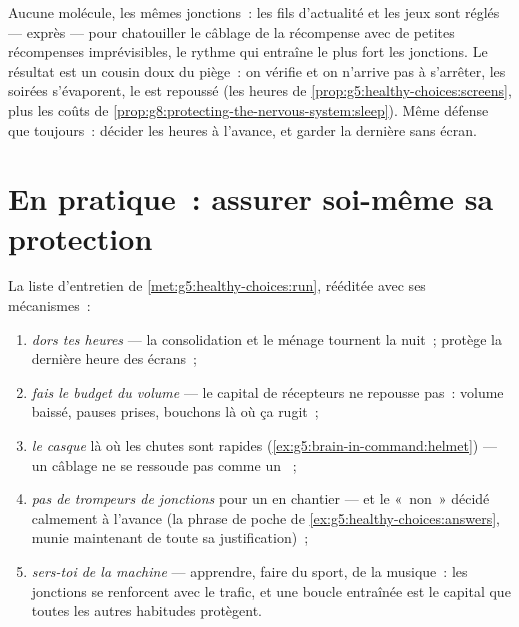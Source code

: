 \begin{example}\label{ex:g8:protecting-the-nervous-system:screens}
Aucune molécule, les mêmes jonctions~: les fils d'actualité
et les jeux sont réglés --- exprès --- pour chatouiller le
câblage de la récompense avec de petites récompenses
imprévisibles, le rythme qui entraîne le plus fort les
jonctions. Le résultat est un cousin doux du piège~: on
vérifie et on n'arrive pas à s'arrêter, les soirées
s'évaporent, le  est repoussé (les heures de
\cref{prop:g5:healthy-choices:screens}, plus les coûts de
\cref{prop:g8:protecting-the-nervous-system:sleep}). Même
défense que toujours~: décider les heures à l'avance, et
garder la dernière sans écran.
\end{example}

\section{En pratique~: assurer soi-même sa protection}

\begin{method}\label{met:g8:protecting-the-nervous-system:manual}
La liste d'entretien de \cref{met:g5:healthy-choices:run},
rééditée avec ses mécanismes~:
\begin{enumerate}
  \item \emph{dors tes heures} --- la consolidation et le
        ménage tournent la nuit~; protège la dernière
        heure des écrans~;
  \item \emph{fais le budget du volume} --- le capital de
        récepteurs ne repousse pas~: volume baissé, pauses
        prises, bouchons là où ça rugit~;
  \item \emph{le casque} là où les chutes sont rapides
        (\cref{ex:g5:brain-in-command:helmet}) --- un
        câblage ne se ressoude pas comme un ~;
  \item \emph{pas de trompeurs de jonctions} pour un
         en chantier --- et le «~non~» décidé
        calmement à l'avance (la phrase de poche de
        \cref{ex:g5:healthy-choices:answers}, munie
        maintenant de toute sa justification)~;
  \item \emph{sers-toi de la machine} --- apprendre, faire
        du sport, de la musique~: les jonctions se
        renforcent avec le trafic, et une boucle entraînée
        est le capital que toutes les autres habitudes
        protègent.
\end{enumerate}
\end{method}

